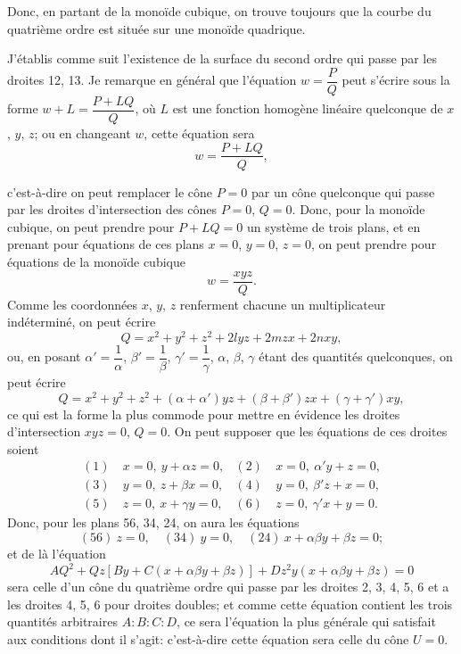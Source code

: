 \documentclass[11pt,a4paper]{article}
\begin{document}
Donc, en partant de la mono\"{i}de cubique, on trouve toujours que la courbe du quatri\`{e}me ordre est situ\'{e}e sur une mono\"{i}de quadrique.

J'\'{e}tablis comme suit l'existence de la surface du second ordre qui passe par les droites 12, 13. Je remarque en g\'{e}n\'{e}ral que l'\'{e}quation $w = \dfrac{P}{Q}$ peut s'\'{e}crire sous la forme $w + L = \dfrac{P + LQ}{Q}$, o\`{u} $L$ est une fonction homog\`{e}ne lin\'{e}aire quelconque de $x$, $y$, $z$; ou en changeant $w$, cette \'{e}quation sera
\[
w = \frac{P + LQ}{Q},
\]

\clearpage

c'est-\`{a}-dire on peut remplacer le c\^{o}ne $P = 0$ par un c\^{o}ne quelconque qui passe par les droites d'intersection des c\^{o}nes $P = 0$, $Q = 0$. Donc, pour la mono\"{i}de cubique, on peut prendre pour $P + LQ = 0$ un syst\`{e}me de trois plans, et en prenant pour \'{e}quations de ces plans $x = 0$, $y = 0$, $z = 0$, on peut prendre pour \'{e}quations de la mono\"{i}de cubique
\[
w = \frac{xyz}{Q}.
\]
Comme les coordonn\'{e}es $x$, $y$, $z$ renferment chacune un multiplicateur ind\'{e}termin\'{e}, on peut \'{e}crire
\[
Q = x^2 + y^2 + z^2 + 2lyz + 2mzx + 2nxy,
\]
ou, en posant $\alpha' = \dfrac{1}{\alpha}$, $\beta' = \dfrac{1}{\beta}$, $\gamma' = \dfrac{1}{\gamma}$, $\alpha$, $\beta$, $\gamma$ \'{e}tant des quantit\'{e}s quelconques, on peut \'{e}crire
\[
Q = x^2 + y^2 + z^2 + (\alpha + \alpha') yz + (\beta + \beta') zx + (\gamma + \gamma') xy,
\]
ce qui est la forme la plus commode pour mettre en \'{e}vidence les droites d'intersection $xyz = 0$, $Q = 0$. On peut supposer que les \'{e}quations de ces droites soient
\begin{align*}
(1)\ & x = 0, \ y + \alpha z = 0, & (2)\ & x = 0, \ \alpha' y + z = 0, \\
(3)\ & y = 0, \ z + \beta x = 0, & (4)\ & y = 0, \ \beta' z + x = 0, \\
(5)\ & z = 0, \ x + \gamma y = 0, & (6)\ & z = 0, \ \gamma' x + y = 0.
\end{align*}
Donc, pour les plans 56, 34, 24, on aura les \'{e}quations
\[
(56)\ z = 0, \quad (34)\ y = 0, \quad (24)\ x + \alpha\beta y + \beta z = 0;
\]
et de l\`{a} l'\'{e}quation
\[
AQ^2 + Qz [By + C(x + \alpha\beta y + \beta z)] + Dz^2 y (x + \alpha\beta y + \beta z) = 0
\]
sera celle d'un c\^{o}ne du quatri\`{e}me ordre qui passe par les droites 2, 3, 4, 5, 6 et a les droites 4, 5, 6 pour droites doubles; et comme cette \'{e}quation contient les trois quantit\'{e}s arbitraires $A : B : C : D$, ce sera l'\'{e}quation la plus g\'{e}n\'{e}rale qui satisfait aux conditions dont il s'agit: c'est-\`{a}-dire cette \'{e}quation sera celle du c\^{o}ne $U = 0$.
\end{document}
